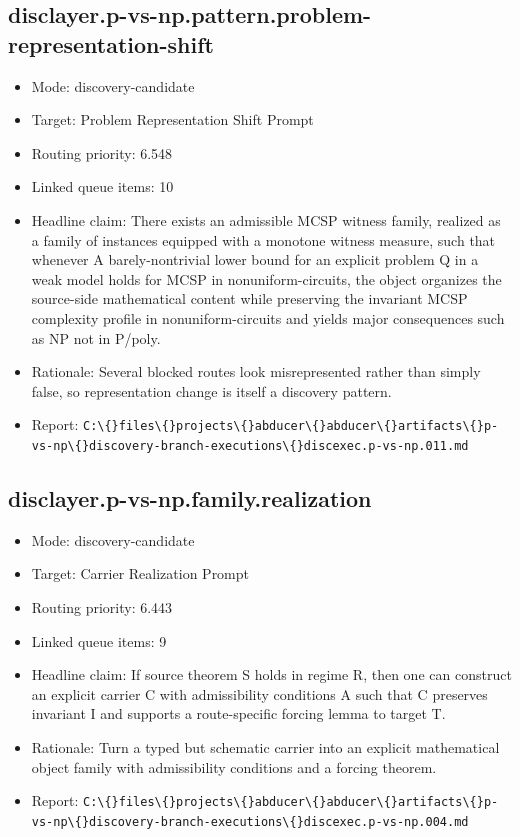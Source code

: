 \documentclass[11pt]{article}
\begin{document}
\subsection*{disclayer.p-vs-np.pattern.problem-representation-shift}
\begin{itemize}
\item Mode: discovery-candidate
\item Target: Problem Representation Shift Prompt
\item Routing priority: 6.548
\item Linked queue items: 10
\item Headline claim: There exists an admissible MCSP witness family, realized as a family of instances equipped with a monotone witness measure, such that whenever A barely-nontrivial lower bound for an explicit problem Q in a weak model holds for MCSP in nonuniform-circuits, the object organizes the source-side mathematical content while preserving the invariant MCSP complexity profile in nonuniform-circuits and yields major consequences such as NP not in P/poly.
\item Rationale: Several blocked routes look misrepresented rather than simply false, so representation change is itself a discovery pattern.
\item Report: \texttt{C:\textbackslash\{\}files\textbackslash\{\}projects\textbackslash\{\}abducer\textbackslash\{\}abducer\textbackslash\{\}artifacts\textbackslash\{\}p-vs-np\textbackslash\{\}discovery-branch-executions\textbackslash\{\}discexec.p-vs-np.011.md}
\end{itemize}

\subsection*{disclayer.p-vs-np.family.realization}
\begin{itemize}
\item Mode: discovery-candidate
\item Target: Carrier Realization Prompt
\item Routing priority: 6.443
\item Linked queue items: 9
\item Headline claim: If source theorem S holds in regime R, then one can construct an explicit carrier C with admissibility conditions A such that C preserves invariant I and supports a route-specific forcing lemma to target T.
\item Rationale: Turn a typed but schematic carrier into an explicit mathematical object family with admissibility conditions and a forcing theorem.
\item Report: \texttt{C:\textbackslash\{\}files\textbackslash\{\}projects\textbackslash\{\}abducer\textbackslash\{\}abducer\textbackslash\{\}artifacts\textbackslash\{\}p-vs-np\textbackslash\{\}discovery-branch-executions\textbackslash\{\}discexec.p-vs-np.004.md}
\end{itemize}
\end{document}
